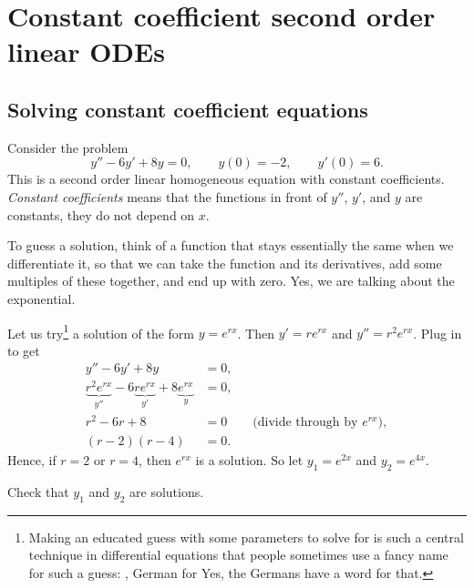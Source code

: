 \sectionnewpage
\section{Constant coefficient second order linear ODEs}
\label{sec:ccsol}



\subsection{Solving constant coefficient equations}

Consider the problem
\begin{equation*}
y''-6y'+8y = 0, \qquad y(0) = - 2, \qquad y'(0) = 6 .
\end{equation*}
This is a second order linear homogeneous equation with constant
coefficients.  \emph{Constant coefficients}
means that the functions 
in front of $y''$, $y'$, and $y$ are constants, they do not depend on $x$.

To guess a solution, think of a function that stays essentially the
same when we differentiate it, so that we can take the function and its
derivatives, add some multiples of these together, and end up with zero.
Yes, we are talking about the exponential.

Let us try\footnote{%
Making an educated guess with some parameters to solve for 
is such a central technique in differential equations that people sometimes use
a fancy name for such a guess: \emph{}, German for   Yes, the Germans have a word for that.}
a solution of the form $y = e^{rx}$.  Then $y' = r e^{rx}$ and
$y'' = r^2 e^{rx}$.  Plug in to get
\begin{align*}
y''-6y'+8y & = 0 , \\
\underbrace{r^2 e^{rx}}_{y''} -6 \underbrace{r e^{rx}}_{y'}+8 \underbrace{e^{rx}}_{y} & = 0 , \\
r^2 -6 r +8 & = 0 \qquad \text{(divide through by } e^{rx} \text{)},\\
(r-2)(r-4) & = 0 .
\end{align*}
Hence, if $r=2$ or $r=4$, then $e^{rx}$ is a solution.  So let $y_1 = e^{2x}$
and $y_2 = e^{4x}$.

\begin{exercise}
Check that $y_1$ and $y_2$ are solutions.
\end{exercise}

